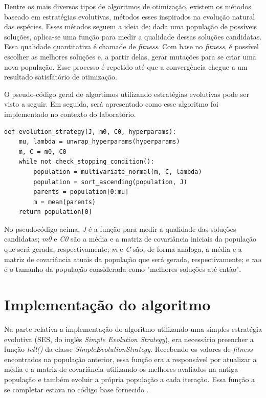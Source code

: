 \documentclass[conference]{IEEEtran}
\begin{document}
Dentre os mais diversos tipos de algoritmos de otimização, existem os métodos baseado em estratégias evolutivas, métodos esses inspirados na evolução natural das espécies. Esses métodos seguem a ideia de: dada uma população de possíveis soluções, aplica-se uma função para medir a qualidade dessas soluções candidatas. Essa qualidade quantitativa é chamade de \textit{fitness}. Com base no \textit{fitness}, é possível escolher as melhores soluções e, a partir delas, gerar mutações para se criar uma nova população. Esse processo é repetido até que a convergência chegue a um resultado satisfatório de otimização.

O pseudo-código geral de algortimos utilizando estratégias evolutivas pode ser visto a seguir. Em seguida, será apresentado como esse algoritmo foi implementado no contexto do laboratório.

\begin{lstlisting}
def evolution_strategy(J, m0, C0, hyperparams):
	mu, lambda = unwrap_hyperparams(hyperparams)
	m, C = m0, C0
	while not check_stopping_condition():
		population = multivariate_normal(m, C, lambda)
		population = sort_ascending(population, J)
		parents = population[0:mu]
		m = mean(parents)
	return population[0]
\end{lstlisting}

No pseudocódigo acima, \textit{J} é a função para medir a qualidade das soluções candidatas; \textit{m0} e \textit{C0} são a média e a matriz de covariância iniciais da população que será gerada, respectivamente; \textit{m} e \textit{C} são, de forma análoga, a média e a matriz de covariância atuais da população que será gerada, respectivamente; e \textit{mu} é o tamanho da população considerada como "melhores soluções até então".

\section{Implementação do algoritmo}
Na parte relativa a implementação do algoritmo utilizando uma simples estratégia evolutiva (SES, do inglês \textit{Simple Evolution Strategy}), era necessário preencher a função \textit{tell()} da classe \textit{SimpleEvolutionStrategy}. Recebendo os valores de \textit{fitness} encontrados na população anterior, essa função era a responsável por atualizar a média e a matriz de covariância utilizando os melhores avaliados na antiga população e também evoluir a própria população a cada iteração. Essa função a se completar estava no código base fornecido \cite{b1}.  
\end{document}

